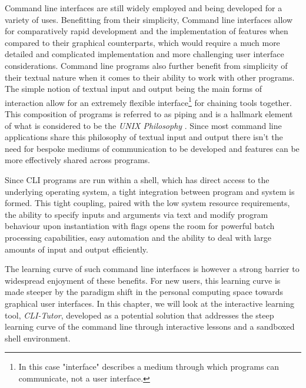 Command line interfaces are still widely employed and being developed for a
variety of uses. Benefitting from their simplicity, Command line interfaces
allow for comparatively rapid development and the implementation of features
when compared to their graphical counterparts, which would require a much more
detailed and complicated implementation and more challenging user interface
considerations. Command line programs also further benefit from simplicity of
their textual nature when it comes to their ability to work with other
programs. The simple notion of textual input and output being the main forms of
interaction allow for an extremely flexible interface\footnote{In this case
    "interface" describes a medium through which programs can communicate, not
a user interface.} for chaining tools together. This composition of programs is
referred to as piping and is a hallmark element of what is considered to be the
\textit{UNIX Philosophy} \cite{mcilroy1978unix}. Since most command line
applications share this philosophy of textual input and output there isn't the
need for bespoke mediums of communication to be developed and features can be
more effectively shared across programs.

Since CLI programs are run within a shell, which has direct access to the
underlying operating system, a tight integration between program and system is
formed. This tight coupling, paired with the low system resource requirements,
the ability to specify inputs and arguments via text and modify program
behaviour upon instantiation with flags opens the room for powerful batch
processing capabilities, easy automation and the ability to deal with large
amounts of input and output efficiently.

The learning curve of such command line interfaces is however a strong barrier
to widespread enjoyment of these benefits. For new users, this learning curve
is made steeper by the paradigm shift in the personal computing space towards
graphical user interfaces. In this chapter, we will look at the interactive
learning tool, \textit{CLI-Tutor}, developed as a potential solution that
addresses the steep learning curve of the command line through interactive
lessons and a sandboxed shell environment.


